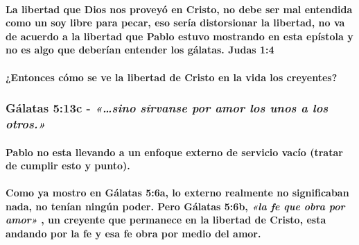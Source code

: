 \documentclass[11a pt,twoside]{article}
\newcommand{\scripture}[1]{%
  {\fontsize{12pt}{16pt}\selectfont\ScriptureFont\itshape #1}%
}
\let\oldsubsubsection\subsubsection
\renewcommand{\subsubsection}{\needspace{4\baselineskip}\oldsubsubsection}
\let\oldparagraph\paragraph
\renewcommand{\paragraph}{\needspace{3\baselineskip}\oldparagraph}
\begin{document}
\paragraph{La libertad que Dios nos proveyó en Cristo, no debe ser mal
entendida como un soy libre para pecar, eso sería distorsionar la
libertad, no va de acuerdo a la libertad que Pablo estuvo mostrando en
esta epístola y no es algo que deberían entender los gálatas. Judas
1:4}\label{la-libertad-que-dios-nos-proveyuxf3-en-cristo-no-debe-ser-mal-entendida-como-un-soy-libre-para-pecar-eso-seruxeda-distorsionar-la-libertad-no-va-de-acuerdo-a-la-libertad-que-pablo-estuvo-mostrando-en-esta-epuxedstola-y-no-es-algo-que-deberuxedan-entender-los-guxe1latas.-judas-14}

\paragraph{¿Entonces cómo se ve la libertad de Cristo en la vida los
creyentes?}\label{entonces-cuxf3mo-se-ve-la-libertad-de-cristo-en-la-vida-los-creyentes}

\subsubsection{\texorpdfstring{Gálatas 5:13c -
\scripture{«…sino sírvanse por amor los unos a los otros.»}}{Gálatas 5:13c - }}\label{guxe1latas-513c---sino-suxedrvanse-por-amor-los-unos-a-los-otros.}

\paragraph{Pablo no esta llevando a un enfoque externo de servicio vacío
(tratar de cumplir esto y
punto).}\label{pablo-no-esta-llevando-a-un-enfoque-externo-de-servicio-vacuxedo-tratar-de-cumplir-esto-y-punto.}

\paragraph{\texorpdfstring{Como ya mostro en Gálatas 5:6a, lo externo
realmente no significaban nada, no tenían ningún poder. Pero Gálatas
5:6b, \scripture{«la fe que obra por amor»}, un creyente que permanece
en la libertad de Cristo, esta andando por la fe y esa fe obra por medio
del
amor.}{Como ya mostro en Gálatas 5:6a, lo externo realmente no significaban nada, no tenían ningún poder. Pero Gálatas 5:6b, , un creyente que permanece en la libertad de Cristo, esta andando por la fe y esa fe obra por medio del amor.}}\label{como-ya-mostro-en-guxe1latas-56a-lo-externo-realmente-no-significaban-nada-no-tenuxedan-ninguxfan-poder.-pero-guxe1latas-56b-la-fe-que-obra-por-amor-un-creyente-que-permanece-en-la-libertad-de-cristo-esta-andando-por-la-fe-y-esa-fe-obra-por-medio-del-amor.}
\end{document}
